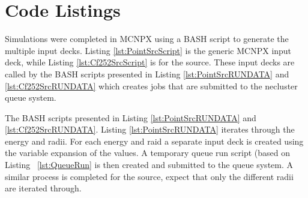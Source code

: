 \section{Code Listings}
Simulations were completed in MCNPX using a BASH script to generate the multiple input decks.
Listing \ref{lst:PointSrcScript} is the generic MCNPX input deck, while Listing \ref{lst:Cf252SrcScript} is for the  source.
These input decks are called by the BASH scripts presented in Listing \ref{lst:PointSrcRUNDATA} and \ref{lst:Cf252SrcRUNDATA} which creates
jobs that are submitted to the necluster queue system.




The BASH scripts presented in Listing \ref{lst:PointSrcRUNDATA} and \ref{lst:Cf252SrcRUNDATA}. 
Listing \ref{lst:PointSrcRUNDATA} iterates through the energy and radii.
For each energy and raid a separate input deck is created using the variable expansion of the values. 
A temporary queue run script (based on Listing ~\ref{lst:QueueRun} is then created and submitted to the queue system.
A similar process is completed for the  source, expect that only the different radii are iterated through.



